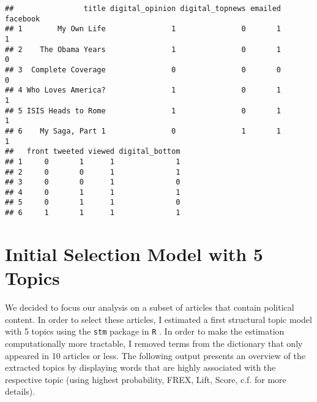 \documentclass[12pt]{article}
\begin{document}
\begin{doublespace}
\begin{knitrout}
\color{fgcolor}\begin{kframe}
\begin{verbatim}
##                title digital_opinion digital_topnews emailed facebook
## 1        My Own Life               1               0       1        1
## 2    The Obama Years               1               0       1        0
## 3  Complete Coverage               0               0       0        0
## 4 Who Loves America?               1               0       1        1
## 5 ISIS Heads to Rome               1               0       1        1
## 6    My Saga, Part 1               0               1       1        1
##   front tweeted viewed digital_bottom
## 1     0       1      1              1
## 2     0       0      1              1
## 3     0       0      1              0
## 4     0       1      1              1
## 5     0       1      1              0
## 6     1       1      1              1
\end{verbatim}
\end{kframe}
\end{knitrout}


\section{Initial Selection Model with 5 Topics}

We decided to focus our analysis on a subset of articles that contain political content. In order to select these articles, I estimated a first structural topic model with 5 topics using the \texttt{stm} package in \texttt{R} \citep[using spectral initialization, see][]{roberts2014structural,roberts2014stm}. In order to make the estimation computationally more tractable, I removed terms from the dictionary that only appeared in 10 articles or less. The following output presents an overview of the extracted topics by displaying words that are highly associated with the respective topic (using highest probability, FREX, Lift, Score, c.f. \citealt{roberts2014stm} for more details).


\end{doublespace}
\end{document}
